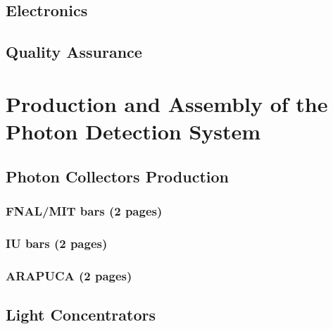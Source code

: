 \subsection{Electronics}
\label{sec:fdsp-pd-pde}


\subsection{Quality Assurance}
\label{sec:fdsp-pd-qa}


\section{Production and Assembly of the Photon Detection System}
\label{sec:fdsp-pd-prod-assy}

\subsection{Photon Collectors Production}
\label{sec:fdsp-pd-prod-pc}
	
\subsubsection{FNAL/MIT bars (2 pages)}
\label{ssec:fdsp-pd-pc-prod-bar1}

\subsubsection{IU bars (2 pages)}
\label{ssec:fdsp-pd-pc-prod-bar2}

\subsubsection{ARAPUCA (2 pages)}
\label{ssec:fdsp-pd-pc-prod-arapuca}



\subsection{Light Concentrators}
\label{sec:fdsp-pd-assy-lc}
	

